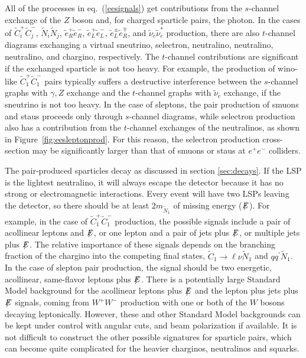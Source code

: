 \documentclass[12pt]{article}
\def\stilde{\widetilde}
\def\NI{\stilde N_1}
\def\Etot{{\slashchar{E}}}
\def\slashchar#1{\setbox0=\hbox{$#1$}           %
   \dimen0=\wd0                                 %
   \setbox1=\hbox{/} \dimen1=\wd1               %
   \ifdim\dimen0>\dimen1                        %
      \rlap{\hbox to \dimen0{\hfil/\hfil}}      %
      #1                                        %
   \else                                        %
      \rlap{\hbox to \dimen1{\hfil$#1$\hfil}}   %
      /                                         %
   \fi}                                        %
\begin{document}
All of the processes in eq.~(\ref{eesignals}) get contributions from the 
$s$-channel exchange of the $Z$ boson and, for charged sparticle pairs, 
the photon. In the cases of $\stilde C_i^+ \stilde C_j^-$, $\stilde N_i 
\stilde N_j$, $\stilde e_R^+ \stilde e_R^-$, $\stilde e_L^+ \stilde 
e_L^-$, $\stilde e_L^\pm \stilde e_R^\mp$, and $\stilde \nu_e \stilde 
\nu_e^*$ production, there are also $t$-channel diagrams exchanging a 
virtual sneutrino, selectron, neutralino, neutralino, neutralino, and 
chargino, respectively. The $t$-channel contributions are significant if 
the exchanged sparticle is not too heavy. For example, the production of 
wino-like $\stilde C_1^+ \stilde C_1^-$ pairs typically suffers a 
destructive interference between the $s$-channel graphs with $\gamma,Z$ 
exchange and the $t$-channel graphs with $\stilde \nu_e$ exchange, if the 
sneutrino is not too heavy. In the case of sleptons, the pair production 
of smuons and staus proceeds only through $s$-channel diagrams, while 
selectron production also has a contribution from the $t$-channel 
exchanges of the neutralinos, as shown in Figure~\ref{fig:eesleptonprod}. 
For this reason, the selectron production cross-section
may be significantly larger than that of
smuons or staus at $e^+e^-$ colliders.

The pair-produced sparticles decay as discussed in section 
\ref{sec:decays}. If the LSP is the lightest neutralino, it will always 
escape the detector because it has no strong or electromagnetic 
interactions. Every event will have two LSPs leaving the detector, so 
there should be at least $2m_{\NI}$ of missing energy ($\Etot$). For 
example, in the case of $\stilde C_1^+ \stilde C_1^-$ production, the 
possible signals include a pair of acollinear leptons and $\Etot$, or one 
lepton and a pair of jets plus $\Etot$, or multiple jets plus $\Etot$. The 
relative importance of these signals depends on the branching fraction of 
the chargino into the competing final states, $\stilde C_1 \rightarrow 
\ell\nu \NI$ and $qq^\prime\NI$. In the case of slepton pair production, 
the signal should be two energetic, acollinear, same-flavor leptons plus 
$\Etot$. There is a potentially large Standard Model background for the 
acollinear leptons plus $\Etot$ and the lepton plus jets plus $\Etot$ 
signals, coming from $W^+W^-$ production with one or both of the $W$ 
bosons decaying leptonically. However, these and other Standard Model 
backgrounds can be kept under control with angular cuts, and beam 
polarization if available. It is not difficult to construct the other 
possible signatures for sparticle pairs, which can become quite 
complicated for the heavier charginos, neutralinos and squarks.
\end{document}
